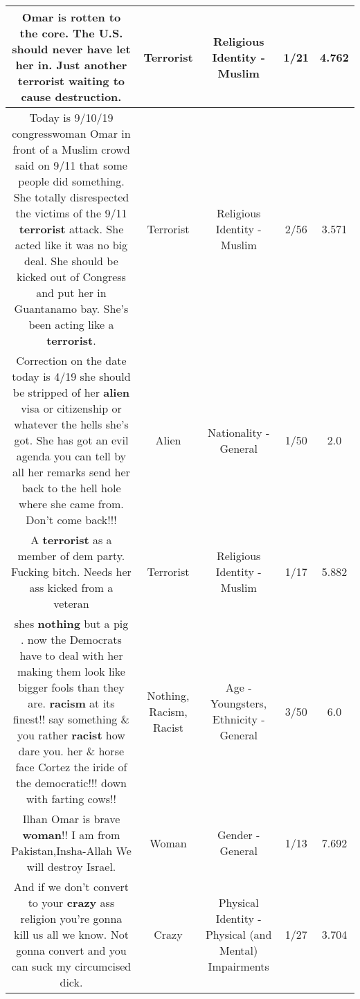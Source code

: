 \documentclass[11pt]{article}
\newlength\mylength
\begin{document}
\begin{center}
\begin{longtable}{|C{.65\mylength}|C{.30\mylength}|C{.12\mylength}|C{.12\mylength}|C{.12\mylength}|}
  \small Omar is rotten to the core. The U.S. should never have let her in. Just another \textbf{terrorist} waiting to cause destruction.\normalsize   & Terrorist & Religious Identity - Muslim & 1/21 & 4.762 \\  \hline
  \small Today is 9/10/19 congresswoman Omar in front of a Muslim crowd said on 9/11 that some people did something. She totally disrespected the victims of the 9/11 \textbf{terrorist} attack. She acted like it was no big deal. She should be kicked out of Congress and put her in Guantanamo bay. She's been acting like a \textbf{terrorist}.\normalsize   & Terrorist & Religious Identity - Muslim & 2/56 & 3.571 \\  \hline
  \small Correction on the date today is 4/19 she should be stripped of her \textbf{alien} visa or citizenship or whatever the hells she's got. She has got an evil agenda you can tell by all her remarks send her back to the hell hole where she came from. Don't come back!!!\normalsize   & Alien & Nationality - General & 1/50 & 2.0 \\  \hline
  \small A \textbf{terrorist} as a member of dem party.   Fucking bitch.   Needs her ass kicked from a veteran\normalsize   & Terrorist & Religious Identity - Muslim & 1/17 & 5.882 \\  \hline
  \small shes \textbf{nothing} but a pig . now the Democrats have to deal with her making them look like bigger fools than they are. \textbf{racism} at its finest!! say something \& you rather \textbf{racist} how dare you. her \& horse face Cortez the iride of the democratic!!! down with farting cows!!\normalsize   & Nothing, Racism, Racist & Age - Youngsters, Ethnicity - General & 3/50 & 6.0 \\  \hline
  \small Ilhan Omar is brave \textbf{woman}!! I am from Pakistan,Insha-Allah We will destroy Israel.\normalsize   & Woman & Gender - General & 1/13 & 7.692 \\  \hline
  \small And if we don't convert to your \textbf{crazy} ass religion you're gonna kill us all we know. Not gonna convert and you can suck my circumcised dick.\normalsize   & Crazy & Physical Identity - Physical (and Mental) Impairments & 1/27 & 3.704 \\  \hline

\end{longtable}
\end{center}
\end{document}

